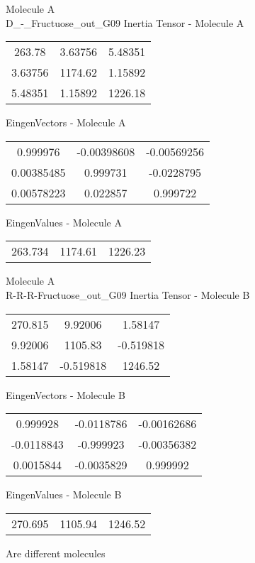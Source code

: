 \newpage
\begin{multicols}{2}
\begin{center}
Molecule A \\ 
D_-_Fructuose_out_G09
Inertia Tensor - Molecule A \\
\vtab
\begin{tabular}{|c c c|}
263.78	 & 	3.63756	 & 	5.48351	 \\
3.63756	 & 	1174.62	 & 	1.15892	 \\
5.48351	 & 	1.15892	 & 	1226.18
\end{tabular}

\vtab
 EingenVectors - Molecule A     \\
\vtab
\begin{tabular}{|c c c|}
0.999976	 & 	-0.00398608	 & 	-0.00569256	 \\
0.00385485	 & 	0.999731	 & 	-0.0228795	 \\
0.00578223	 & 	0.022857	 & 	0.999722
\end{tabular}

\vtab
 EingenValues - Molecule A     \\
\vtab
\begin{tabular}{|c c c|}
263.734	 & 	1174.61	 & 	1226.23
\end{tabular}
\columnbreak
Molecule A \\ 
R-R-R-Fructuose_out_G09
Inertia Tensor - Molecule B \\
\vtab
\begin{tabular}{|c c c|}
270.815	 & 	9.92006	 & 	1.58147	 \\
9.92006	 & 	1105.83	 & 	-0.519818	 \\
1.58147	 & 	-0.519818	 & 	1246.52
\end{tabular}

\vtab
 EingenVectors - Molecule B     \\
\vtab
\begin{tabular}{|c c c|}
0.999928	 & 	-0.0118786	 & 	-0.00162686	 \\
-0.0118843	 & 	-0.999923	 & 	-0.00356382	 \\
0.0015844	 & 	-0.0035829	 & 	0.999992
\end{tabular}

\vtab
 EingenValues - Molecule B     \\
\vtab
\begin{tabular}{|c c c|}
270.695	 & 	1105.94	 & 	1246.52
\end{tabular}
\textcolor{NavyBlue}{\large Are different molecules}
\end{center}
\end{multicols}
